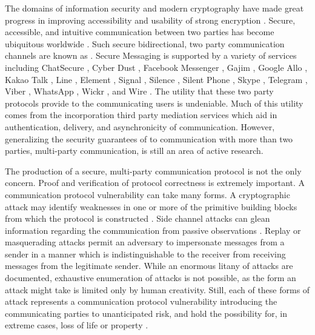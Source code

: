 The domains of information security and modern cryptography have made great progress in improving accessibility and usability of strong encryption \autocite{sheng2006johnny, hof2015towards, bai2016inconvenient, bai2017balancing, wang2017usability}.
Secure, accessible, and intuitive communication between two parties has become ubiquitous worldwide \autocite{schroder2016signal, cronin2015growth, shenson2016rapid, HOONAKKER201763, vaziripour2017you, jahn2018usability}.
Such secure bidirectional, two party communication channels are known as  \autocite{unger2015sok}.
Secure Messaging is supported by a variety of services \autocite{mujaj2017comparison} including ChatSecure \autocite{ChatSecure}, Cyber Dust \autocite{CyberDust}, Facebook Messenger \autocite{FB-Messenger}, Gajim \autocite{Gajim}, Google Allo \autocite{marlinspike2016open}, Kakao Talk \autocite{KakaoTalk}, Line \autocite{Line}, Element \autocite{Element}, Signal \autocite{perrin2016double, marlinspike2016x3dh}, Silence \autocite{Silence}, Silent Phone \autocite{SilentPhone}, Skype \autocite{Skype}, Telegram \autocite{Telegram}, Viber \autocite{Viber}, WhatsApp \autocite{WhatsApp}, Wickr \autocite{Wickr}, and Wire \autocite{Wire}.
The utility that these two party protocols provide to the communicating users is undeniable.
Much of this utility comes from the incorporation third party mediation services which aid in authentication, delivery, and asynchronicity of communication.
However, generalizing the security guarantees of  to communication with more than two parties, multi-party communication, is still an area of active research.

The production of a secure, multi-party communication protocol is not the only concern.
Proof and verification of protocol correctness \autocite{kobeissi2017automated, alwen2019double, chen2021anonymous, bienstock2022more} is extremely important.
A communication protocol vulnerability can take many forms.
A cryptographic attack may identify weaknesses in one or more of the primitive building blocks from which the protocol is constructed \autocite{al2008comparative}.
Side channel attacks can glean information regarding the communication from passive observations \autocite{kocher1996timing, molnar2005program, chen2010side}.
Replay or masquerading attacks \autocite{syverson1994taxonomy, pries2008new, ustun2019novel} permit an adversary to impersonate messages from a sender in a manner which is indistinguishable to the receiver from receiving messages from the legitimate sender.
While an enormous litany of attacks are documented, exhaustive enumeration of attacks is not possible, as the form an attack might take is limited only by human creativity.
Still, each of these forms of attack represents a communication protocol vulnerability introducing the communicating parties to unanticipated risk, and hold the possibility for, in extreme cases, loss of life or property \autocite{farwell2011stuxnet, 10.1145/2508701, chung2017critical, kagalwalla2019cybersecurity, gunduz2020cyber}.

